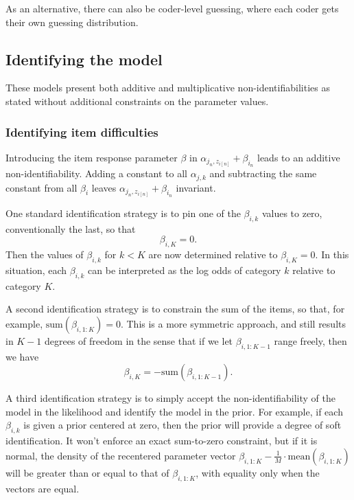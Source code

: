 \documentclass[10pt]{article}
\newcommand{\range}[2]{#1{:}#2}
\newcommand{\rng}[1]{\range{1}{#1}}
\begin{document}
As an alternative, there can also be coder-level guessing, where each
coder gets their own guessing distribution.





\subsection*{Identifying the model}

These models present both additive and multiplicative
non-identifiabilities as stated without additional constraints on the
parameter values.

\subsubsection*{Identifying item difficulties}

Introducing the item response parameter $\beta$ in
$\alpha_{j_n, z_{i[n]}} + \beta_{i_n}$ leads to an additive
non-identifiability.  Adding a constant to all $\alpha_{j,k}$ and
subtracting the same constant from all $\beta_{i}$ leaves
$\alpha_{j_n, z_{i[n]}} + \beta_{i_n}$ invariant.

One standard identification strategy is to pin one of the $\beta_{i, k}$
values to zero, conventionally the last, so that
\[
  \beta_{i, K} = 0.
\]
Then the values of $\beta_{i, k}$ for $k < K$ are now determined
relative to $\beta_{i, K} = 0$. In this situation, each $\beta_{i, k}$
can be interpreted as the log odds of category $k$ relative to
category $K$.

A second identification strategy is to constrain the sum of the items,
so that, for example, $\textrm{sum}(\beta_{i, \rng{K}}) = 0.$  This
is a more symmetric approach, and still results in $K - 1$ degrees of
freedom in the sense that if we let $\beta_{i, \rng{K-1}}$ range
freely, then we have
\[
  \beta_{i, K} = -\textrm{sum}(\beta_{i, \rng{K-1}}).
\]

A third identification strategy is to simply accept the
non-identifiability of the model in the likelihood and identify the
model in the prior.  For example, if each $\beta_{i, k}$ is given a
prior centered at zero, then the prior will provide a degree of soft
identification.  It won't enforce an exact sum-to-zero constraint, but
if it is normal, the density of the recentered parameter vector
$\beta_{i, \rng{K}} - \frac{1}{M} \cdot \textrm{mean}(\beta_{i,
  \rng{K}})$ will be greater than or equal to that of $\beta_{i,
  \rng{K}}$, with equality only when the vectors are equal.
\end{document}
